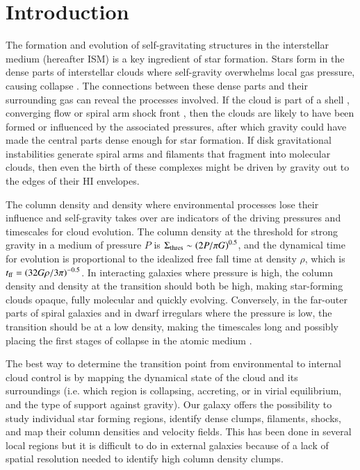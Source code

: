 \documentclass{aa}
\begin{document}
\section{Introduction}
\label{intro}

The formation and evolution of self-gravitating structures in the interstellar medium
(hereafter ISM) is a key ingredient of star formation.
Stars form in the dense parts of interstellar clouds where self-gravity overwhelms
local gas pressure, causing collapse \citep{mckee07}. The connections between
these dense parts and their surrounding gas can reveal the processes involved. If
the cloud is part of a shell \citep{palmeirim17}, converging flow
\citep{2018PASJ...70S..55W} or spiral arm shock front \citep{elmegreen14}, then the clouds
are likely to have been formed or influenced by the associated pressures, after
which gravity could have made the central parts dense enough for star formation.
If disk gravitational instabilities generate spiral arms and filaments that
fragment into molecular clouds, then even  the birth of these complexes might be
driven by gravity out to the edges of their HI envelopes.

The column density and density where   environmental processes lose their influence
and self-gravity takes over are indicators of the driving pressures and timescales for
cloud evolution. The column density at the threshold for strong gravity in a medium of
pressure $P$ is $\Sigma_{\rm thres}\sim\left(2P/\pi G\right)^{0.5}$, and the dynamical
time for evolution is proportional to the idealized free fall time at density $\rho$,
which is $t_{\rm ff}=\left(32 G\rho/3\pi\right)^{-0.5}$. In interacting galaxies where
pressure is high, the column density and density at the transition should both be high,
making star-forming clouds opaque, fully molecular and quickly evolving. Conversely, in
the far-outer parts of spiral galaxies and in dwarf irregulars where the pressure is
low, the transition should be at a low density, making the timescales long and possibly
placing the first stages of collapse in the atomic medium
\citep[e.g.,][]{michalowski15,meidt16,elmegreen18}.

The best way to determine the transition point from environmental to internal cloud
control is by mapping the dynamical state of the cloud  and its surroundings
 (i.e. which region is collapsing, accreting, or in virial equilibrium,  and 
the type of support against gravity). 
Our galaxy offers the possibility to study individual star forming regions, identify 
dense clumps, filaments, shocks, and map their column densities and velocity fields.
This has been done in several local regions 
\citep[e.g.,][]{deharveng15,figueira17} but it is difficult to do in external galaxies
\citep{hirota11,donovan13,colombo14,tosaki17,baba17,faesi18} because of a lack of
spatial resolution needed to identify high column density clumps. 
 
\end{document}
